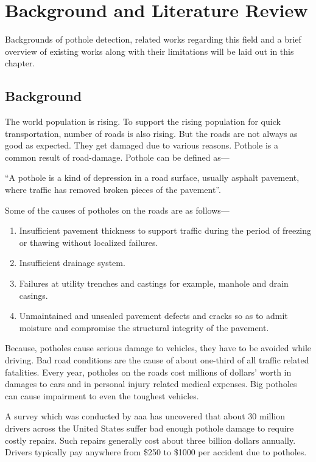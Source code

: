 \chapter{Background and Literature Review}

Backgrounds of pothole detection, related works regarding this field and a brief overview of existing works along with their limitations will be laid out in this chapter.

\section{Background}
    The world population is rising. To support the rising population for quick transportation, number of roads is also rising. But the roads are not always as good as expected. They get damaged due to various reasons. Pothole is a common result of road-damage. Pothole can be defined as---
    
    ``A pothole is a kind of depression in a road surface, usually asphalt pavement, where traffic has removed broken pieces of the pavement''\cite{wiki:potholes}.
    
    Some of the causes of potholes on the roads are as follows\cite{wiki:potholes}---
    \begin{enumerate}
        \item {Insufficient pavement thickness to support traffic during the period of freezing or thawing without localized failures.}
        \item{Insufficient drainage system.}
        \item{Failures at utility trenches and castings for example, manhole and drain casings.}
        \item{Unmaintained and unsealed pavement defects and cracks so as to admit moisture and compromise the structural integrity of the pavement.}
    \end{enumerate}
    
    \clearpage
    
    Because, potholes cause serious damage to vehicles, they have to be avoided while driving. Bad road conditions are the cause of about one-third of all traffic related fatalities. Every year, potholes on the roads cost millions of dollars’ worth in damages to cars and in personal injury related medical expenses. Big potholes can cause impairment to even the toughest vehicles\cite{romanjul19}.

    A survey which was conducted by \acrfull{aaa} has uncovered that about 30 million drivers across the United States suffer bad enough pothole damage to require costly repairs. Such repairs generally cost about three billion dollars annually. Drivers typically pay anywhere from \$250 to \$1000 per accident due to potholes\cite{romanjul19}.
    
